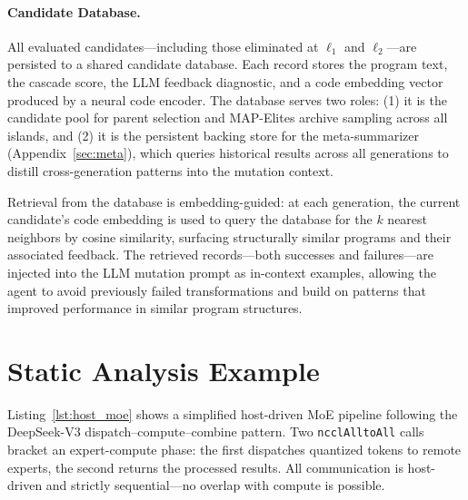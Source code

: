\paragraph{Candidate Database.}
All evaluated candidates---including those eliminated at $\ell_1$ and $\ell_2$---are persisted to a shared candidate database. Each record stores the program text, the cascade score, the LLM feedback diagnostic, and a code embedding vector produced by a neural code encoder. The database serves two roles: (1) it is the candidate pool for parent selection and MAP-Elites archive sampling across all islands, and (2) it is the persistent backing store for the meta-summarizer (Appendix~\ref{sec:meta}), which queries historical results across all generations to distill cross-generation patterns into the mutation context.

Retrieval from the database is embedding-guided: at each generation, the current candidate's code embedding is used to query the database for the $k$ nearest neighbors by cosine similarity, surfacing structurally similar programs and their associated feedback. The retrieved records---both successes and failures---are injected into the LLM mutation prompt as in-context examples, allowing the agent to avoid previously failed transformations and build on patterns that improved performance in similar program structures.

\section{Static Analysis Example}
\label{app:analysis_example}

Listing~\ref{lst:host_moe} shows a simplified host-driven MoE pipeline following the DeepSeek-V3 dispatch--compute--combine pattern. Two \texttt{ncclAlltoAll} calls bracket an expert-compute phase: the first dispatches quantized tokens to remote experts, the second returns the processed results. All communication is host-driven and strictly sequential---no overlap with compute is possible.

